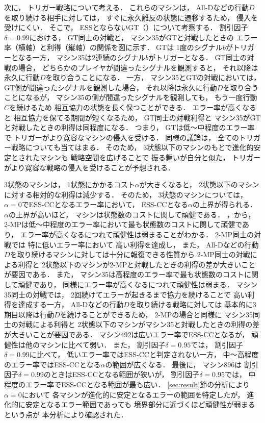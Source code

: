\documentclass[submit]{ipsj}
\theoremstyle{definition}
\begin{document}
次に，
トリガー戦略について考える．
これらのマシンは，
All-Dなどの行動$D$を取り続ける相手に対しては，
すぐに永久離反の状態に遷移するため，
侵入を受けにくい．
そこで，
ESSとならないGT（）について考察する．
割引因子$\delta = 0.99$における，
GT同士の対戦と，
マシン35がGTと対戦したときの
エラー率（横軸）と利得（縦軸）の関係を図に示す．
GTは
1度のシグナル$b$がトリガーとなる一方，
マシン35は2連続のシグナル$b$がトリガーとなる．
GT同士の対戦の場合，
どちらかのプレイヤが間違ったシグナルを観測すると，
それ以降は永久に行動$D$を取り合うことになる．
一方，
マシン35とGTの対戦においては，
GT側が間違ったシグナルを観測した場合，
それ以降は永久に行動$D$を取り合うことになるが，
マシン35の側が間違ったシグナルを観測しても，
もう一度行動$C$を続けるため
相互協力の状態を長く保つことができる．
エラー率が高くなると
相互協力を保てる期間が短くなるため，
GT同士の対戦利得と
マシン35がGTと対戦したときの利得は同程度になる．
つまり，
GTは低〜中程度のエラー率で
トリガーがより寛容なマシンの侵入を受ける．
同様の議論は，
全てのトリガー戦略についても当てはまる．
そのため，
3状態以下のマシンのもとで進化的安定とされたマシンも
戦略空間を広げることで
振る舞いが自分と似た，
トリガーがより寛容な戦略の侵入を受けることが予想される．

3状態のマシンは，
1状態にかかるコスト$\alpha$が大きくなると，
2状態以下のマシンに対する相対的な利得は減少する．
そのため，
3状態のマシンについては，
$\alpha = 0$でESS-CCとなるエラー率において，
ESS-CCとなる$\alpha$の上界が得られる．
$\alpha$の上界が高いほど，
マシンは状態数のコストに関して頑健である．
，から，
2-MPは低〜中程度のエラー率において最も状態数のコストに関して頑健であり，
エラー率が高くなるにつれて頑健性は弱まることがわかる．
2-MP同士の対戦では
特に低いエラー率において
高い利得を達成し，
また，
All-Dなどの行動$D$を取り続けるマシンに対しては十分に報復できる性質から
2-MP同士の対戦による利得と
2状態以下のマシンが2-MPと対戦したときの利得の差が大きいことが要因である．
また，
マシン35は高程度のエラー率で最も状態数のコストに関して頑健であり，
同様にエラー率が高くなるにつれて頑健性は弱まる．
マシン35同士の対戦では，
2回続けてエラーが起きるまで協力を続けることで
高い利得を達成する一方，
All-Dなどの行動$D$を取り続ける戦略に対しては
基本的に3期目以降は行動$D$を続けることができるため，
2-MPの場合と同様に
マシン35同士の対戦による利得と
2状態以下のマシンがマシン35と対戦したときの利得の差が大きいことが要因である．
マシン492は広いエラー率でESS-CCとなるが，
頑健性は他のマシンに比べて弱い．
また，
割引因子$\delta = 0.95$では，
割引因子$\delta = 0.99$に比べて，
低いエラー率ではESS-CCと判定されない一方，
中〜高程度のエラー率ではESS-CCとなる$\alpha$の範囲が広くなる．
最後に，
マシン896は
割引因子$\delta = 0.99$のときはESS-CCとなる範囲が狭いが，
割引因子$\delta = 0.95$では，
中程度のエラー率でESS-CCとなる範囲が最も広い．
\ref{sec:result}節の分析により
$\alpha = 0$において
各マシンが進化的に安定となるエラーの範囲を特定したが，
進化的に安定となるエラー範囲であっても
境界部分に近づくほど頑健性が弱まるという点が
本分析により確認された．
\end{document}
